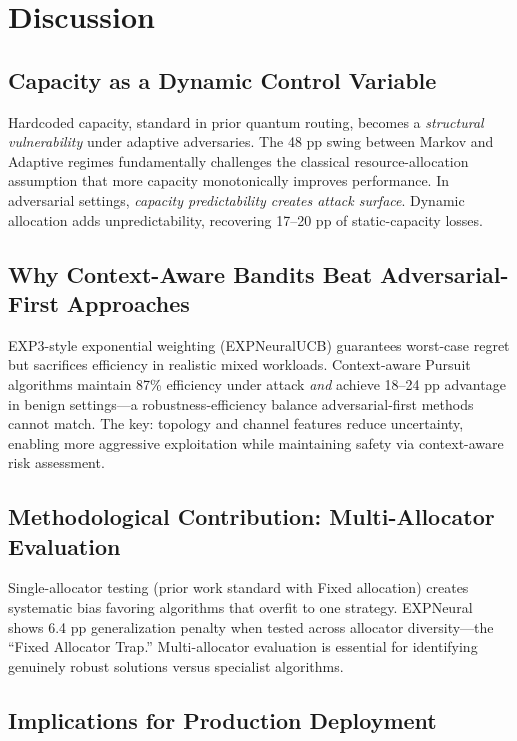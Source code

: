 \documentclass[10pt,twocolumn,journal]{IEEEtran}
\begin{document}
\section{Discussion}
\label{sec:discussion}

\subsection{Capacity as a Dynamic Control Variable}

Hardcoded capacity, standard in prior quantum routing, becomes a \textit{structural vulnerability} under adaptive adversaries. The 48 pp swing between Markov and Adaptive regimes fundamentally challenges the classical resource-allocation assumption that more capacity monotonically improves performance. In adversarial settings, \textit{capacity predictability creates attack surface}. Dynamic allocation adds unpredictability, recovering 17--20 pp of static-capacity losses.

\subsection{Why Context-Aware Bandits Beat Adversarial-First Approaches}

EXP3-style exponential weighting (EXPNeuralUCB) guarantees worst-case regret but sacrifices efficiency in realistic mixed workloads. Context-aware Pursuit algorithms maintain 87\% efficiency under attack \textit{and} achieve 18--24 pp advantage in benign settings—a robustness-efficiency balance adversarial-first methods cannot match. The key: topology and channel features reduce uncertainty, enabling more aggressive exploitation while maintaining safety via context-aware risk assessment.

\subsection{Methodological Contribution: Multi-Allocator Evaluation}

Single-allocator testing (prior work standard with Fixed allocation) creates systematic bias favoring algorithms that overfit to one strategy. EXPNeural shows 6.4 pp generalization penalty when tested across allocator diversity—the ``Fixed Allocator Trap.'' Multi-allocator evaluation is essential for identifying genuinely robust solutions versus specialist algorithms.

\subsection{Implications for Production Deployment}
\end{document}
